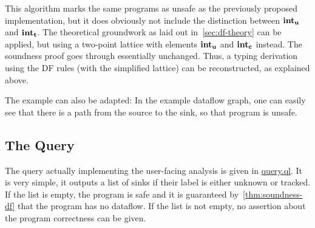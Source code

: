 This algorithm marks the same programs as unsafe as the previously proposed implementation,
but it does obviously not include the distinction between $\textbf{int}_\textbf{u}$ and $\textbf{int}_\textbf{t}$.
The theoretical groundwork as laid out in~\autoref{sec:df-theory} can be applied,
but using a two-point lattice with elements $\textbf{int}_\textbf{u}$ and $\textbf{int}_\textbf{c}$ instead.
The soundness proof goes through essentially unchanged.
Thus, a typing derivation using the DF rules (with the simplified lattice) 
can be reconstructed, as explained above.

The example can also be adapted: In the example dataflow graph, one can easily
see that there is a path from the source to the sink, so that program is unsafe.

\subsection{The Query}
The query actually implementing the user-facing analysis is given in \hyperref[lst:query]{query.ql}.
It is very simple, it outputs a list of sinks if their label is either unknown or tracked.
If the list is empty, the program is safe and it is guaranteed by~\autoref{thm:soundness-df}
that the program has no dataflow.
If the list is not empty, no assertion about the program correctness can be given.
